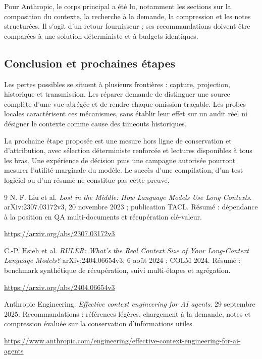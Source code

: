 \documentclass[11pt,a4paper]{article}
\begin{document}
Pour Anthropic, le corps principal a été lu, notamment les sections sur la composition du contexte, la recherche à la demande, la compression et les notes structurées. Il s'agit d'un retour fournisseur ; ses recommandations doivent être comparées à une solution déterministe et à budgets identiques.

\begin{samepage}
\section{Conclusion et prochaines étapes}
Les pertes possibles se situent à plusieurs frontières : capture, projection,
historique et transmission. Les réparer demande de distinguer une source
complète d'une vue abrégée et de rendre chaque omission traçable.
Les probes locales caractérisent ces mécanismes, sans établir leur effet sur
un audit réel ni désigner le contexte comme cause des timeouts historiques.

La prochaine étape proposée est une mesure hors ligne de conservation et
d'attribution, avec sélection déterministe renforcée et lectures disponibles
à tous les bras. Une expérience de décision puis une campagne autorisée
pourront mesurer l'utilité marginale du modèle. Le succès d'une compilation,
d'un test logiciel ou d'un résumé ne constitue pas cette preuve.

\par\end{samepage}
{}
\begin{thebibliography}{9}
\small
{} N. F. Liu et al. \emph{Lost in the Middle: How Language Models Use Long Contexts}. arXiv:2307.03172v3, 20 novembre 2023 ; publication TACL. Résumé : dépendance à la position en QA multi-documents et récupération clé-valeur.\par
\url{https://arxiv.org/abs/2307.03172v3}

 C.-P. Hsieh et al. \emph{RULER: What's the Real Context Size of Your Long-Context Language Models?} arXiv:2404.06654v3, 6 août 2024 ; COLM 2024. Résumé : benchmark synthétique de récupération, suivi multi-étapes et agrégation.\par
\url{https://arxiv.org/abs/2404.06654v3}

 Anthropic Engineering. \emph{Effective context engineering for AI agents}. 29 septembre 2025. Recommandations : références légères, chargement à la demande, notes et compression évaluée sur la conservation d'informations utiles.\par
\url{https://www.anthropic.com/engineering/effective-context-engineering-for-ai-agents}
\end{thebibliography}
\end{document}

